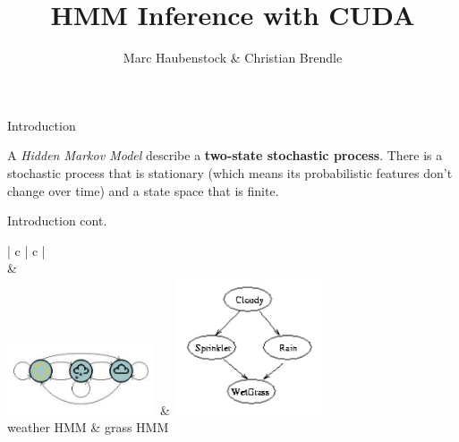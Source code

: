 \documentclass[11pt]{beamer}
\begin{document}
\begin{frame}
\title{HMM Inference with CUDA}
\subtitle{Marc Haubenstock \& Christian Brendle}

\titlepage
\end{frame}


\begin{frame}{Introduction}

A \emph{Hidden Markov Model} describe a \textbf{two-state stochastic process}.
There is a stochastic process that is stationary (which means its probabilistic features don't change over time) and a state space that is finite.

\end{frame}

\begin{frame}{Introduction cont.}
\begin{table}[h]
	\begin{center}
		\begin{tabular}{| c | c |}
			\hline
			 \\
			\hline
			& \\
			\includegraphics[width=0.33\textwidth]{./Images/FiniteStateAutomaton_1.png} & \includegraphics[width=0.33\textwidth]{./Images/FiniteStateAutomaton_2.png} \\
			\hline
			weather HMM  & grass HMM  \\
			\hline
		\end{tabular}
	\end{center}
	\caption{Two finite state automatons that describe the state space of two different HMMs. Nodes correspond to states and edges to transition probabilites betwenn states that are bigger than $0$.}
	\label{tab:FiniteSA}
\end{table}


\end{frame}
\end{document}
